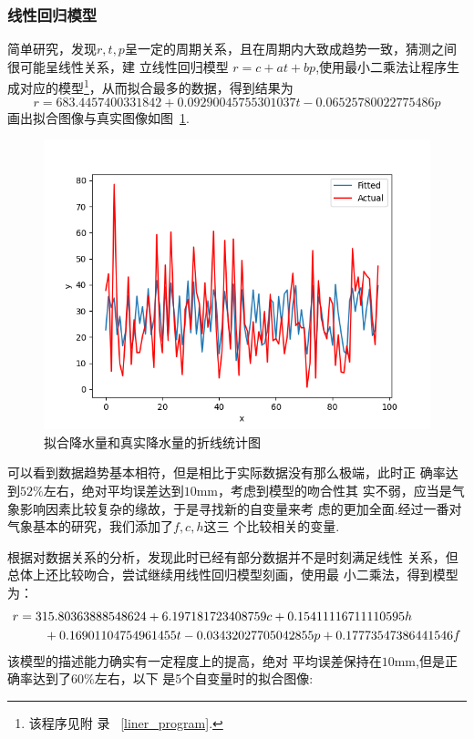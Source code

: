 \documentclass[UTF8, a4paper]{ctexart}
\begin{document}
\subsubsection{线性回归模型}

简单研究，发现$r,t,p$呈一定的周期关系，且在周期内大致成趋势一致，猜测之间很可能呈线性关系，建
立线性回归模型 $r=c+at+bp$,使用最小二乘法让程序生成对应的模型\footnote{该程序见附
	录~\textcolor{red}{ \ref{liner_program}}.}，从而拟合最多的数据，得到结果为
$$r=683.4457400331842+0.09290045755301037t-0.06525780022775486p$$画出拟合图像与真实图像如图~\textcolor{red}{\ref{pic7}}.

\begin{figure}[h!]
	\centering
	\includegraphics[scale=0.3]{fit1.png}
	\caption{拟合降水量和真实降水量的折线统计图\label{pic7}}

\end{figure}
可以看到数据趋势基本相符，但是相比于实际数据没有那么极端，此时正
确率达到$52\%$左右，绝对平均误差达到$10$\si{\milli\meter}，考虑到模型的吻合性其
实不弱，应当是气象影响因素比较复杂的缘故，于是寻找新的自变量来考
虑的更加全面.经过一番对气象基本的研究，我们添加了$f,c,h$这三
个比较相关的变量.

根据对数据关系的分析，发现此时已经有部分数据并不是时刻满足线性
关系，但总体上还比较吻合，尝试继续用线性回归模型刻画，使用最
小二乘法，得到模型为：
\begin{align}
	\notag
	r & =315.80363888548624+6.197181723408759c+0.15411116711110595h \\
	\notag
	  & \qquad +0.16901104754961455t-0.03432027705042855p+0.17773547386441546f
\end{align}
该模型的描述能力确实有一定程度上的提高，绝对
平均误差保持在$10$\si{\milli\meter},但是正确率达到了$60\%$左右，以下
是5个自变量时的拟合图像:
\end{document}
